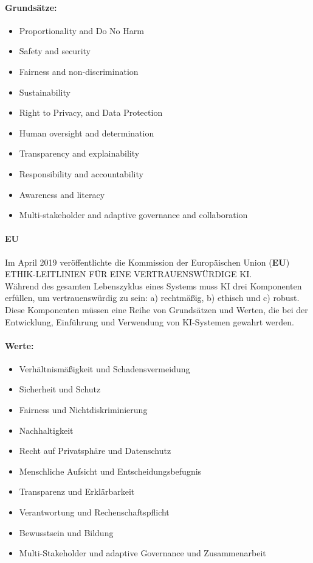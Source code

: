 \documentclass[12pt]{report}
\begin{document}
\paragraph{Grundsätze:}
\begin{itemize}
	\item  Proportionality and Do No Harm
	\item  Safety and security
	\item  Fairness and non-discrimination
	\item  Sustainability
	\item  Right to Privacy, and Data Protection
	\item  Human oversight and determination
	\item  Transparency and explainability
	\item  Responsibility and accountability
	\item  Awareness and literacy
	\item  Multi-stakeholder and adaptive governance and collaboration
\end{itemize}
\paragraph{EU\cite{EUCommision}\\}
Im April 2019 veröffentlichte die Kommission der Europäischen Union (\textbf{EU}) \glqq ETHIK-LEITLINIEN FÜR EINE VERTRAUENSWÜRDIGE KI\glqq{}.\\Während des gesamten Lebenszyklus eines Systems muss KI drei Komponenten erfüllen, um vertrauenswürdig zu sein: a) rechtmäßig, b) ethisch und c) robust. Diese Komponenten müssen eine Reihe von Grundsätzen und Werten, die bei der Entwicklung, Einführung und Verwendung von KI-Systemen gewahrt werden.

\paragraph{Werte:}
\begin{itemize}
	\item  Verhältnismäßigkeit und Schadensvermeidung
	\item  Sicherheit und Schutz
	\item  Fairness und Nichtdiskriminierung
	\item  Nachhaltigkeit
	\item  Recht auf Privatsphäre und Datenschutz
	\item  Menschliche Aufsicht und Entscheidungsbefugnis
	\item  Transparenz und Erklärbarkeit
	\item  Verantwortung und Rechenschaftspflicht
	\item  Bewusstsein und Bildung
	\item Multi-Stakeholder und adaptive Governance und Zusammenarbeit
\end{itemize}
\end{document}
